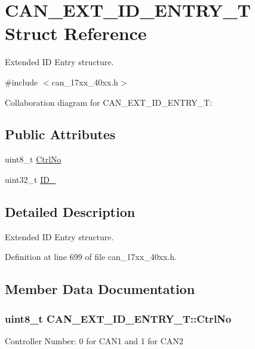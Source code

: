 \hypertarget{structCAN__EXT__ID__ENTRY__T}{}\section{C\+A\+N\+\_\+\+E\+X\+T\+\_\+\+I\+D\+\_\+\+E\+N\+T\+R\+Y\+\_\+T Struct Reference}
\label{structCAN__EXT__ID__ENTRY__T}


Extended ID Entry structure.  




{\ttfamily \#include $<$can\+\_\+17xx\+\_\+40xx.\+h$>$}



Collaboration diagram for C\+A\+N\+\_\+\+E\+X\+T\+\_\+\+I\+D\+\_\+\+E\+N\+T\+R\+Y\+\_\+T\+:
\subsection*{Public Attributes}
\begin{DoxyCompactItemize}
\item 
uint8\+\_\+t \hyperlink{structCAN__EXT__ID__ENTRY__T_ad8ed0ed8438c467abe045573bd079190}{Ctrl\+No}
\item 
uint32\+\_\+t \hyperlink{structCAN__EXT__ID__ENTRY__T_a3e67827310c81e3e17cb067dd25155b3}{I\+D\+\_}
\end{DoxyCompactItemize}


\subsection{Detailed Description}
Extended ID Entry structure. 

Definition at line 699 of file can\+\_\+17xx\+\_\+40xx.\+h.



\subsection{Member Data Documentation}
\subsubsection[{\texorpdfstring{Ctrl\+No}{CtrlNo}}]{\setlength{\rightskip}{0pt plus 5cm}uint8\+\_\+t C\+A\+N\+\_\+\+E\+X\+T\+\_\+\+I\+D\+\_\+\+E\+N\+T\+R\+Y\+\_\+\+T\+::\+Ctrl\+No}\hypertarget{structCAN__EXT__ID__ENTRY__T_ad8ed0ed8438c467abe045573bd079190}{}\label{structCAN__EXT__ID__ENTRY__T_ad8ed0ed8438c467abe045573bd079190}
Controller Number\+: 0 for C\+A\+N1 and 1 for C\+A\+N2 


